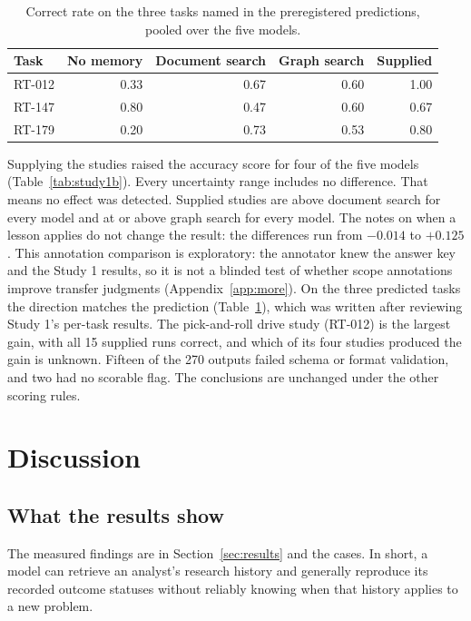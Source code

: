 \documentclass[11pt]{article}
\begin{document}
\begin{table}[ht]
\centering
\caption{Correct rate on the three tasks named in the preregistered predictions, pooled over the five models.}
\label{tab:study1b_tasks}
\small
\begin{tabular}{lrrrr}
\toprule
Task & No memory & Document search & Graph search & Supplied \\
\midrule
RT-012 & 0.33 & 0.67 & 0.60 & 1.00 \\
RT-147 & 0.80 & 0.47 & 0.60 & 0.67 \\
RT-179 & 0.20 & 0.73 & 0.53 & 0.80 \\
\bottomrule
\end{tabular}
\end{table}

Supplying the studies raised the accuracy score for four of the five models (Table~\ref{tab:study1b}). Every uncertainty range includes no difference. That means no effect was detected. Supplied studies are above document search for every model and at or above graph search for every model. The notes on when a lesson applies do not change the result: the differences run from $-0.014$ to $+0.125$. This annotation comparison is exploratory: the annotator knew the answer key and the Study 1 results, so it is not a blinded test of whether scope annotations improve transfer judgments (Appendix~\ref{app:more}). On the three predicted tasks the direction matches the prediction (Table~\ref{tab:study1b_tasks}), which was written after reviewing Study 1's per-task results. The pick-and-roll drive study (RT-012) is the largest gain, with all 15 supplied runs correct, and which of its four studies produced the gain is unknown. Fifteen of the 270 outputs failed schema or format validation, and two had no scorable flag. The conclusions are unchanged under the other scoring rules.

\section{Discussion}
\label{sec:discussion}

\subsection{What the results show}

The measured findings are in Section~\ref{sec:results} and the cases. In short, a model can retrieve an analyst's research history and generally reproduce its recorded outcome statuses without reliably knowing when that history applies to a new problem.
\end{document}
